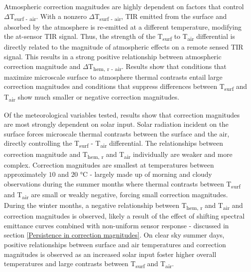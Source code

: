 Atmospheric correction magnitudes are highly dependent on factors that control $\Delta$T\textsubscript{surf - air}. With a nonzero $\Delta$T\textsubscript{surf - air}, TIR emitted from the surface and absorbed by the atmosphere is re-emitted at a different temperature, modifying the at-sensor TIR signal. Thus, the strength of the T\textsubscript{surf} to T\textsubscript{air} differential is directly related to the magnitude of atmospheric effects on a remote sensed TIR signal. This results in a strong positive relationship between atmospheric correction magnitude and $\Delta$T\textsubscript{hem, r - air}. Results show that conditions that maximize microscale surface to atmosphere thermal contrasts entail large correction magnitudes and conditions that suppress differences between T\textsubscript{surf} and T\textsubscript{air} show much smaller or negative correction magnitudes.

Of the meteorological variables tested, results show that correction magnitudes are most strongly dependent on solar input. Solar radiation incident on the surface forces microscale thermal contrasts between the surface and the air, directly controlling the T\textsubscript{surf} - T\textsubscript{air} differential. The relationships between correction magnitude and T\textsubscript{hem, r} and T\textsubscript{air} individually are weaker and more complex. Correction magnitudes are smallest at temperatures between approximately $10$ and $20$ \si{\degreeCelsius} - largely made up of morning and cloudy observations during the summer months where thermal contrasts between T\textsubscript{surf} and T\textsubscript{air} are small or weakly negative, forcing small correction magnitudes. During the winter months, a negative relationship between T\textsubscript{hem, r} and T\textsubscript{air} and correction magnitudes is observed, likely a result of the effect of shifting spectral emittance curves combined with non-uniform sensor response - discussed in section \ref{Persistence in correction magnitudes}. On clear sky summer days, positive relationships between surface and air temperatures and correction magnitudes is observed as an increased solar input foster higher overall temperatures and large contrasts between T\textsubscript{surf} and T\textsubscript{air}.

